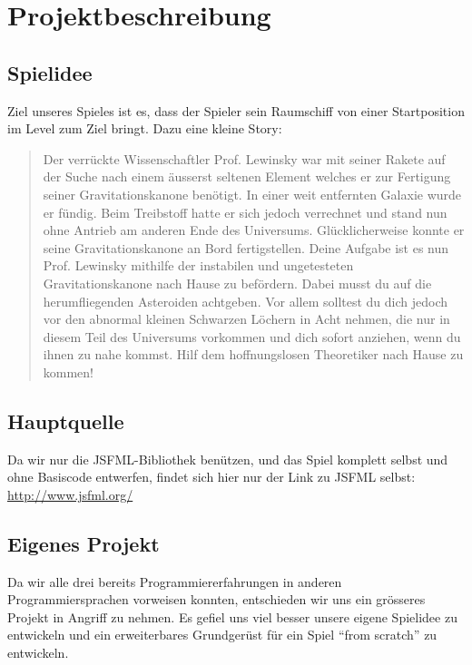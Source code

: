 \documentclass[12pt,a4paper]{scrartcl}
\newcommand{\q}[1]{``#1''}
\begin{document}


\clearpage

\tableofcontents

\clearpage

\section{Projektbeschreibung}
\subsection{Spielidee}
Ziel unseres Spieles ist es, dass der Spieler sein Raumschiff von einer Startposition im Level
zum Ziel bringt. Dazu eine kleine Story:
\begin{quote}
Der verrückte Wissenschaftler Prof. Lewinsky war mit seiner Rakete auf der Suche nach einem äusserst seltenen Element welches er zur Fertigung seiner Gravitationskanone benötigt. 
In einer weit entfernten Galaxie wurde er fündig. 
Beim Treibstoff hatte er sich jedoch verrechnet und stand nun ohne Antrieb am anderen Ende des Universums.
Glücklicherweise konnte er seine Gravitationskanone an Bord fertigstellen.
Deine Aufgabe ist es nun Prof. Lewinsky mithilfe der instabilen und ungetesteten Gravitationskanone nach Hause zu befördern. 
Dabei musst du auf die herumfliegenden Asteroiden achtgeben. 
Vor allem solltest du dich jedoch vor den abnormal kleinen Schwarzen Löchern in Acht nehmen, die nur in diesem Teil des Universums vorkommen und dich sofort anziehen, wenn du ihnen zu nahe kommst. 
Hilf dem hoffnungslosen Theoretiker nach Hause zu kommen!
\end{quote}

\subsection{Hauptquelle}
Da wir nur die JSFML-Bibliothek benützen, und das Spiel komplett selbst und ohne Basiscode entwerfen, findet sich hier nur der Link 
zu JSFML selbst: \url{http://www.jsfml.org/}

\subsection{Eigenes Projekt}
Da wir alle drei bereits Programmiererfahrungen in anderen Programmiersprachen vorweisen konnten, entschieden wir uns ein grösseres Projekt
in Angriff zu nehmen. Es gefiel uns viel besser unsere eigene Spielidee zu entwickeln und ein erweiterbares Grundgerüst für ein Spiel \q{from scratch}
zu entwickeln.
\end{document}
